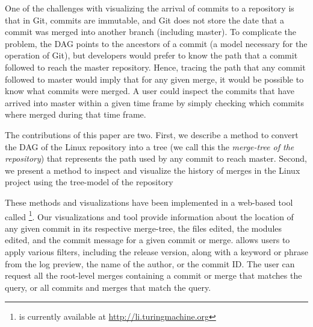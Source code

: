 \documentclass[conference, draftclsnofoot, draft]{IEEEtran}
\begin{document}
One of the challenges with visualizing the arrival of commits to a repository is that
in Git, commits are immutable, and Git does not store the date that a commit was merged into another branch (including master).
To complicate the problem, the DAG points to the ancestors of a commit (a model necessary for the operation of Git), but developers 
would prefer to know the path that a commit followed to reach the master repository.
Hence, tracing the path that any commit followed to master would imply that for any given merge, it would be possible to know what commits were merged. A user could
inspect the commits that have arrived into master within a given time frame by simply checking which commits where merged during that time frame.



The contributions of this paper are two. First, we describe a method to convert the DAG of the Linux repository into a tree (we call this the \emph{merge-tree of the
        repository}) that represents the path used by
any commit to reach master. Second, 
we present a method to inspect and visualize the history of merges in the  Linux project using the tree-model of the repository

These methods and visualizations have been implemented in a web-based
tool called \tool\footnote{\tool is currently available at \url{http://li.turingmachine.org}}. Our visualizations and tool provide information about the location of any given
commit in its respective merge-tree, the files edited, the modules edited, and the
commit message for a given commit or merge. \tool allows users to apply various
filters, including the release version, along with a keyword or phrase from the log
preview, the name of the author, or the commit ID. The user can request all the
root-level merges containing a commit or merge that matches the query, or all
commits and merges that match the query.
\end{document}
